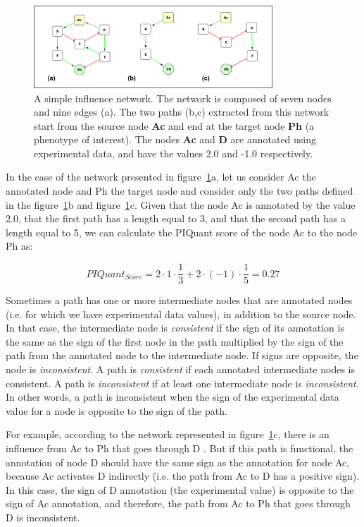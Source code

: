 \begin{figure}
  \centering
  \includegraphics[width=0.8\textwidth]{graphics/piquant_networks}
  \caption{A simple influence network. The network is composed of seven nodes
and nine edges (a). The two paths (b,c) extracted from this network start from
the source node \textbf{Ac} and end at the target node \textbf{Ph} (a phenotype of interest). The
nodes \textbf{Ac} and \textbf{D} are annotated using experimental data, and have the values 2.0
and -1.0 respectively.}
  \label{PIQuant_example}
\end{figure}


In the case of the network presented in figure~\ref{PIQuant_example}a, let us
consider Ac the annotated node and Ph the target node and consider only the two
paths defined in the figure~\ref{PIQuant_example}b and
figure~\ref{PIQuant_example}c. Given that the
node Ac is annotated by the value $2.0$, that the first path has a length
equal to 3, and that the second path has a length equal to 5, we can calculate the PIQuant score
of the node Ac to the node Ph as:

$$
 PIQuant_{Score} = 2 \cdot 1 \cdot \frac{1}{3} + 2 \cdot (-1) \cdot \frac{1}{5}
= 0.27
$$


Sometimes a path has one or more intermediate nodes that are annotated nodes
(i.e. for which we have experimental data values),
in addition to the source node.
In that case, the intermediate node is \textit{consistent} if the sign of its
annotation is the same as the sign of the first node in the path multiplied by
the sign of the
path from the annotated node to the intermediate node. If signs are opposite, the
node is \textit{inconsistent}.
A path is \textit{consistent} if each annotated intermediate nodes is
consistent. A path is \textit{inconsistent} if at least one intermediate node is
\textit{inconsistent}.
In other words, a path is inconsistent when the
sign of the experimental data value for a node is opposite to the sign
of the path.

For example, according to the network represented in figure~\ref{PIQuant_example}c, there is an influence from Ac to Ph
that goes through D . But if this path
is functional, the annotation of node D should have the same sign as the annotation for node Ac, because
Ac activates D indirectly (i.e. the path from Ac to D has a positive sign). In this case, the sign of D annotation (the experimental value) is opposite to
the sign of Ac annotation, and therefore, the path from Ac to Ph that goes through D is inconsistent.

